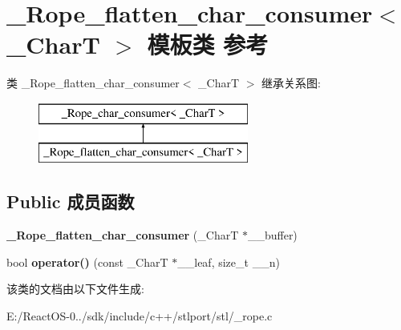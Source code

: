 \hypertarget{class___rope__flatten__char__consumer}{}\section{\+\_\+\+Rope\+\_\+flatten\+\_\+char\+\_\+consumer$<$ \+\_\+\+CharT $>$ 模板类 参考}
\label{class___rope__flatten__char__consumer}
类 \+\_\+\+Rope\+\_\+flatten\+\_\+char\+\_\+consumer$<$ \+\_\+\+CharT $>$ 继承关系图\+:\begin{figure}[H]
\begin{center}
\leavevmode
\includegraphics[height=2.000000cm]{class___rope__flatten__char__consumer}
\end{center}
\end{figure}
\subsection*{Public 成员函数}
\begin{DoxyCompactItemize}
\item 
\mbox{\label{class___rope__flatten__char__consumer_a36fe424b34296f9b29b123eeb5cfd60b}} 
{\bfseries \+\_\+\+Rope\+\_\+flatten\+\_\+char\+\_\+consumer} (\+\_\+\+CharT $\ast$\+\_\+\+\_\+buffer)
\item 
\mbox{\label{class___rope__flatten__char__consumer_aeb2a0563e01f23644f613c6de8901bbe}} 
bool {\bfseries operator()} (const \+\_\+\+CharT $\ast$\+\_\+\+\_\+leaf, size\+\_\+t \+\_\+\+\_\+n)
\end{DoxyCompactItemize}


该类的文档由以下文件生成\+:\begin{DoxyCompactItemize}
\item 
E\+:/\+React\+O\+S-\/0../sdk/include/c++/stlport/stl/\+\_\+rope.\+c\end{DoxyCompactItemize}
